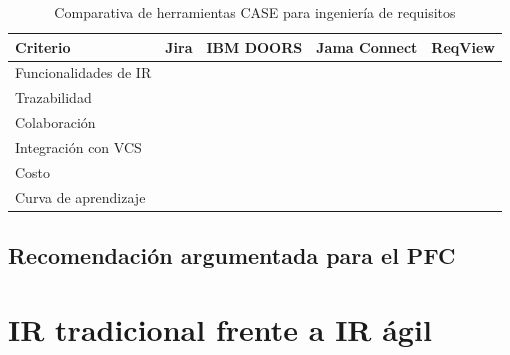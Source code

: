 \documentclass[journal,onecolumn]{IEEEtran}
\newcommand{\guia}[2]{%
	\begin{mdframed}[style=guia]
		\sloppy
		\noindent\textbf{Responsable: #1}\\[2pt]
		#2
	\end{mdframed}
}
\newif\ifguias
\let\guiaoriginal\guia
\renewcommand{\guia}[2]{\ifguias\guiaoriginal{#1}{#2}\fi}
\begin{document}
	\begin{table}[H]
		\centering
		\caption{Comparativa de herramientas CASE para ingeniería de requisitos}
		\begin{tabular}{L{2.6cm} L{2.4cm} L{2.4cm} L{2.4cm} L{2.4cm}}
			\toprule
			\textbf{Criterio} & \textbf{Jira} & \textbf{IBM DOORS} & \textbf{Jama Connect} &
			\textbf{ReqView} \\
			\midrule
			Funcionalidades de IR   & & & & \\
			Trazabilidad            & & & & \\
			Colaboración            & & & & \\
			Integración con VCS     & & & & \\
			Costo                   & & & & \\
			Curva de aprendizaje    & & & & \\
			\bottomrule
		\end{tabular}
	\end{table}
	
	\subsection{Recomendación argumentada para el PFC}
	
	\guia{Kevin (Integrante 2)}{%
		Cuadro de mínimo 4 herramientas con al menos 6 criterios. Cada celda debe ser un
		\textbf{juicio sustentado con fuente}, no una copia del sitio comercial (la rúbrica lo
		señala como error frecuente y baja C6). Contrastar con el uso real que el equipo hizo de la
		herramienta en la sección 7.\\[3pt]
		La recomendación debe decir \textbf{por qué para MundiPets en concreto} --- equipo de tres,
		presupuesto cero, ERS de 50 elementos, necesidad de trazabilidad hasta caso de prueba ---,
		no cuál es «la mejor» en abstracto.}
	
	\section{IR tradicional frente a IR ágil}
	
\end{document}
